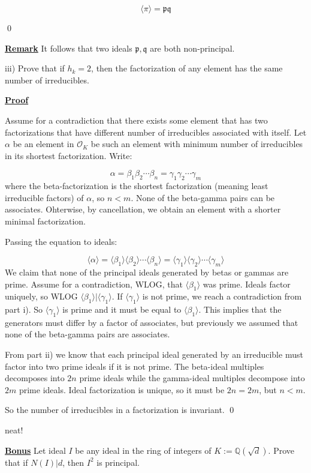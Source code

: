 \documentclass{article}
\newcommand{\new}[1]{
    \vspace{2mm}
    \noindent
    \textbf{
    \underline{#1}}
}
\def\contradiction{{\lightning}}
\newcommand{\Proof}{{
    \vspace{2mm}
    \noindent
    \textbf{
    \underline{Proof}}
}
}
\newcommand{\<}{{{
    \langle
}}}
\def\>{{{
    \rangle
}}}
\newcommand{\ringInt}{
    {\mathcal{O}}
}
\newcommand{\pideal}{
    {{\mathfrak{p}}}
}
\newcommand{\qideal}{
    {{\mathfrak{q}}}
}
\def\QQ{\mathbb{Q}}
\begin{document}
\[
    \<\pi\> = \pideal \qideal
\]

\qed

\new{Remark} It follows that two ideals $\pideal, \qideal$ 
are both non-principal. 

iii) Prove that if $h_k = 2$, then the factorization 
of any element has the same number of irreducibles. 

\Proof 

Assume for a contradiction that there exists 
some element that has two factorizations that have different 
number of irreducibles associated with itself. Let $\alpha$ 
be an element in $\ringInt_K$ be such an element with minimum 
number of irreducibles in its shortest factorization. Write:

\[
    \alpha = \beta_1 \beta_2 \cdots \beta_n = 
    \gamma_1 \gamma _2 \cdots \gamma_m
\]
where the beta-factorization is the shortest factorization 
(meaning least irreducible factors) of $\alpha$, so $n<m$.  
None of the beta-gamma pairs can be associates. Ohterwise, 
by cancellation, we obtain an element with a shorter minimal
factorization. 

Passing the equation to ideals:

\[
    \<\alpha\> = \<\beta_1\>\<\beta_2\> \cdots \<\beta_n\> 
    =
    \<\gamma_1\>\<\gamma_2\> \cdots \<\gamma_m\>
\]
We claim that none of the principal ideals generated by 
betas or gammas are prime. Assume for a contradiction, WLOG, that 
$\<\beta_1\>$ was prime. Ideals factor uniquely, so WLOG 
$\<\beta_1\>|\<\gamma_1\>$. If $\<\gamma_1\>$ is not prime, we 
reach a contradiction from part i). So $\<\gamma_1\>$ is prime 
and it must be equal to $\<\beta_1\>$. This implies that 
the generators must differ by a factor of associates, but previously 
we assumed that none of the beta-gamma pairs are associates. \contradiction 

From part ii) we know that each principal ideal generated by 
an irreducible must factor into two prime ideals if it is not prime. 
The beta-ideal multiples decomposes into $2n$ prime ideals while 
the gamma-ideal multiples decompose into $2m$ prime ideals. Ideal 
factorization is unique, so it must be $2n = 2m$, but $n < m$. \contradiction 

So the number of irreducibles in a factorization is invariant. 
\qed

\color{blue}
neat!

\color{black}

\newpage

\new{Bonus} Let ideal $I$ be any ideal in the ring of integers 
of $K := \QQ(\sqrt{d})$. Prove that if $N(I)|d$, then $I^2$ is principal. 
\end{document}
